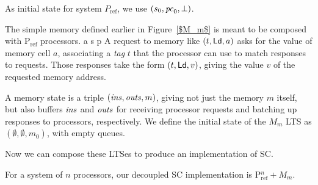 As initial state for system $P_\text{ref}$, we use $(s_0, \mathit{pc}_0, \bot)$.


The simple memory defined earlier in Figure~\ref{$M_m$} is meant to be composed with P$_{\text{ref}}$
processors.  %
a%
s%
p%
A request to memory like $(t, \mathsf{Ld}, a)$ asks
for the value of memory cell $a$, associating a \emph{tag} $t$ that the
processor can use to match responses to requests.  Those responses take the
form $(t, \mathsf{Ld}, v)$, giving the value $v$ of the requested memory address.

A memory state is a triple $(\mathit{ins}, \mathit{outs}, m)$, giving not just the
memory $m$ itself, but also buffers $\mathit{ins}$ and $\mathit{outs}$ for receiving
processor requests and batching up responses to processors,
respectively.  We define the initial state of the $M_m$ LTS as
$(\emptyset, \emptyset, m_0)$, with empty queues.


Now we can compose these LTSes to produce an implementation of SC. 

For a system of $n$ processors, our decoupled SC implementation is
$\text{P$^n_{\text{ref}}$} + M_m$.

